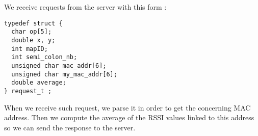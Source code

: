 We receive requests from the server with this form :

\begin{lstlisting}
typedef struct {
  char op[5];
  double x, y;
  int mapID;
  int semi_colon_nb;
  unsigned char mac_addr[6];
  unsigned char my_mac_addr[6];
  double average;
} request_t ;
\end{lstlisting}

When we receive such request, we parse it in order to get the concerning MAC
address. Then we compute the average of the RSSI values linked to this address
so we can send the response to the server.





